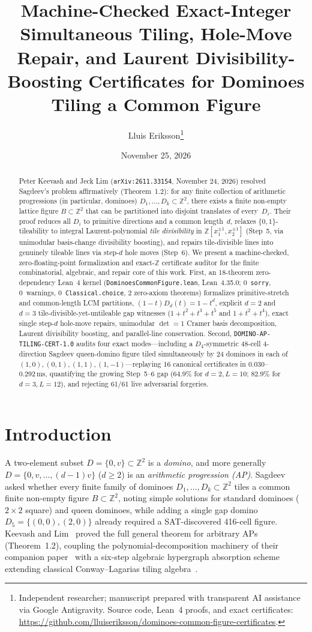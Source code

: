 \documentclass[11pt,twocolumn]{article}
\title{\textbf{Machine-Checked Exact-Integer Simultaneous Tiling, Hole-Move Repair, and Laurent Divisibility-Boosting Certificates for Dominoes Tiling a Common Figure}}
\author{Lluis Eriksson\thanks{Independent researcher; manuscript prepared with transparent AI assistance via Google Antigravity. Source code, Lean~4 proofs, and exact certificates: \url{https://github.com/lluiseriksson/dominoes-common-figure-certificates}.}}
\date{November 25, 2026}
\newcommand{\ZZ}{\mathbb{Z}}
\begin{document}
\maketitle

\begin{abstract}
Peter Keevash and Jeck Lim (\texttt{arXiv:2611.33154}, November 24, 2026) resolved Sagdeev's problem affirmatively (Theorem~1.2): for any finite collection of arithmetic progressions (in particular, dominoes) $D_1,\dots,D_k \subset \ZZ^2$, there exists a finite non-empty lattice figure $B \subset \ZZ^2$ that can be partitioned into disjoint translates of every~$D_i$. Their proof reduces all $D_i$ to primitive directions and a common length~$d$, relaxes $\{0,1\}$-tileability to integral Laurent-polynomial \emph{tile divisibility} in $\ZZ[x_1^{\pm 1}, x_2^{\pm 1}]$ (Step~5, via unimodular basis-change divisibility boosting), and repairs tile-divisible lines into genuinely tileable lines via step-$d$ hole moves (Step~6). We present a machine-checked, zero-floating-point formalization and exact-$\ZZ$ certificate auditor for the finite combinatorial, algebraic, and repair core of this work. First, an 18-theorem zero-dependency Lean~4 kernel (\texttt{DominoesCommonFigure.lean}, Lean~4.35.0; 0~\texttt{sorry}, 0~warnings, 0~\texttt{Classical.choice}, 2 zero-axiom theorems) formalizes primitive-stretch and common-length LCM partitions, $(1-t)D_d(t) = 1-t^d$, explicit $d=2$ and $d=3$ tile-divisible-yet-untileable gap witnesses ($1+t^2+t^3+t^5$ and $1+t^2+t^4$), exact single step-$d$ hole-move repairs, unimodular $\det=1$ Cramer basis decomposition, Laurent divisibility boosting, and parallel-line conservation. Second, \texttt{DOMINO-AP-TILING-CERT-1.0} audits four exact modes—including a $D_4$-symmetric 48-cell 4-direction Sagdeev queen-domino figure tiled simultaneously by 24 dominoes in each of $(1,0),(0,1),(1,1),(1,-1)$—replaying 16 canonical certificates in $0.030$--$0.292\,\mathrm{ms}$, quantifying the growing Step~5--6 gap ($64.9\%$ for $d=2, L=10$; $82.9\%$ for $d=3, L=12$), and rejecting 61/61 live adversarial forgeries.
\end{abstract}

\section{Introduction}
A two-element subset $D = \{0, v\} \subset \ZZ^2$ is a \emph{domino}, and more generally $D = \{0, v, \dots, (d-1)v\}$ ($d \ge 2$) is an \emph{arithmetic progression (AP)}. Sagdeev~\cite{sagdeev2024mathoverflow} asked whether every finite family of dominoes $D_1,\dots,D_k \subset \ZZ^2$ tiles a common finite non-empty figure $B \subset \ZZ^2$, noting simple solutions for standard dominoes ($2\times 2$ square) and queen dominoes, while adding a single gap domino $D_5 = \{(0,0),(2,0)\}$ already required a SAT-discovered 416-cell figure. Keevash and Lim~\cite{keevash2026dominoes} proved the full general theorem for arbitrary APs (Theorem~1.2), coupling the polynomial-decomposition machinery of their companion paper~\cite{keevash2026reconfig} with a six-step algebraic hypergraph absorption scheme extending classical Conway--Lagarias tiling algebra~\cite{conway1990tiling}.
\end{document}
